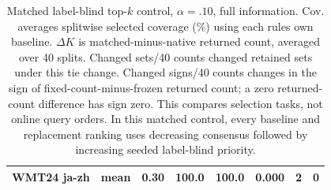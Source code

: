 \begin{table}[t]
\begin{tabular}{llrrrrrr}
WMT24 ja-zh & mean & 0.30 & 100.0 & 100.0 & 0.000 & 2 & 0 \\
\bottomrule
\end{tabular}
\caption{Matched label-blind top-$k$ control, $\alpha=.10$, full information. Cov. averages splitwise selected coverage (\%) using each rule\textquotesingle s own baseline. $\Delta K$ is matched-minus-native returned count, averaged over 40 splits. Changed sets/40 counts changed retained sets under this tie change. Changed signs/40 counts changes in the sign of fixed-count-minus-frozen returned count; a zero returned-count difference has sign zero. This compares selection tasks, not online query orders. In this matched control, every baseline and replacement ranking uses decreasing consensus followed by increasing seeded label-blind priority.}
\label{tab:matched-tie-control}
\end{table}

